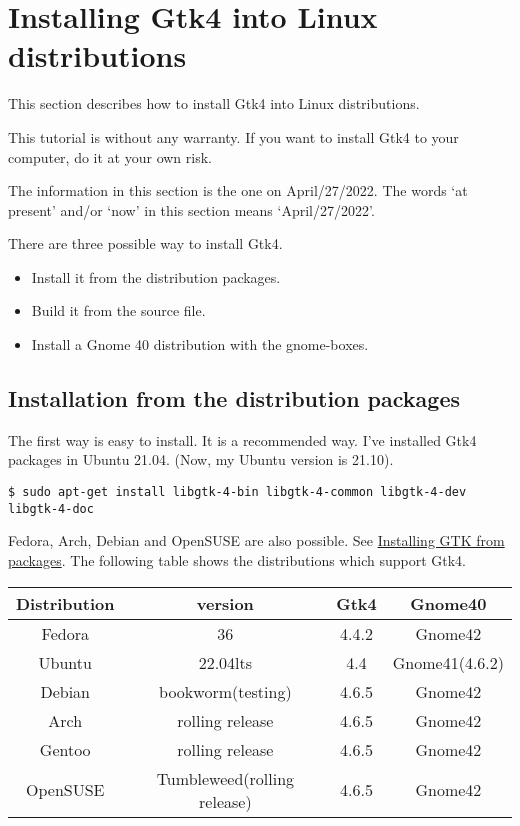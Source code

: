\hypertarget{installing-gtk4-into-linux-distributions}{%
\section{Installing Gtk4 into Linux
distributions}\label{installing-gtk4-into-linux-distributions}}

This section describes how to install Gtk4 into Linux distributions.

This tutorial is without any warranty. If you want to install Gtk4 to
your computer, do it at your own risk.

The information in this section is the one on April/27/2022. The words
`at present' and/or `now' in this section means `April/27/2022'.

There are three possible way to install Gtk4.

\begin{itemize}
\tightlist
\item
  Install it from the distribution packages.
\item
  Build it from the source file.
\item
  Install a Gnome 40 distribution with the gnome-boxes.
\end{itemize}

\hypertarget{installation-from-the-distribution-packages}{%
\subsection{Installation from the distribution
packages}\label{installation-from-the-distribution-packages}}

The first way is easy to install. It is a recommended way. I've
installed Gtk4 packages in Ubuntu 21.04. (Now, my Ubuntu version is
21.10).

\begin{lstlisting}
$ sudo apt-get install libgtk-4-bin libgtk-4-common libgtk-4-dev libgtk-4-doc
\end{lstlisting}

Fedora, Arch, Debian and OpenSUSE are also possible. See
\href{https://www.gtk.org/docs/installations/linux\#installing-gtk-from-packages}{Installing
GTK from packages}. The following table shows the distributions which
support Gtk4.

\begin{longtable}[]{@{}cccc@{}}
\toprule
Distribution & version & Gtk4 & Gnome40\tabularnewline
\midrule
\endhead
Fedora & 36 & 4.4.2 & Gnome42\tabularnewline
Ubuntu & 22.04lts & 4.4 & Gnome41(4.6.2)\tabularnewline
Debian & bookworm(testing) & 4.6.5 & Gnome42\tabularnewline
Arch & rolling release & 4.6.5 & Gnome42\tabularnewline
Gentoo & rolling release & 4.6.5 & Gnome42\tabularnewline
OpenSUSE & Tumbleweed(rolling release) & 4.6.5 & Gnome42\tabularnewline
\bottomrule
\end{longtable}

